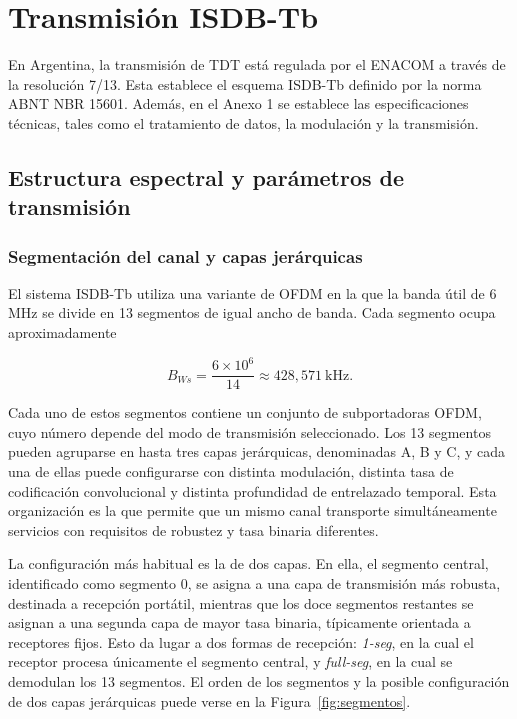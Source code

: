 \chapter{Transmisión ISDB-Tb}
\label{chap:isdbtb_tx}


En Argentina, la transmisión de TDT está regulada por el ENACOM a través de la resolución 7/13. Esta establece el esquema ISDB-Tb definido por la norma ABNT NBR 15601. Además, en el Anexo 1 se establece las especificaciones técnicas, tales como el tratamiento de datos, la modulación y la transmisión.


\section{Estructura espectral y parámetros de transmisión}

\subsection{Segmentación del canal y capas jerárquicas}

El sistema ISDB-Tb utiliza una variante de OFDM en la que la banda útil de 6 MHz se divide en 13 segmentos de igual ancho de banda. Cada segmento ocupa aproximadamente

\begin{equation}
B_{Ws}=\frac{6\times 10^6}{14}\approx 428{,}571\ \mathrm{kHz}.
\end{equation}

Cada uno de estos segmentos contiene un conjunto de subportadoras OFDM, cuyo número depende del modo de transmisión seleccionado. Los 13 segmentos pueden agruparse en hasta tres capas jerárquicas, denominadas A, B y C, y cada una de ellas puede configurarse con distinta modulación, distinta tasa de codificación convolucional y distinta profundidad de entrelazado temporal. Esta organización es la que permite que un mismo canal transporte simultáneamente servicios con requisitos de robustez y tasa binaria diferentes.

La configuración más habitual es la de dos capas. En ella, el segmento central, identificado como segmento 0, se asigna a una capa de transmisión más robusta, destinada a recepción portátil, mientras que los doce segmentos restantes se asignan a una segunda capa de mayor tasa binaria, típicamente orientada a receptores fijos. Esto da lugar a dos formas de recepción: \textit{1-seg}, en la cual el receptor procesa únicamente el segmento central, y \textit{full-seg}, en la cual se demodulan los 13 segmentos. El orden de los segmentos y la posible configuración de dos capas jerárquicas puede verse en la Figura~\ref{fig:segmentos}.

